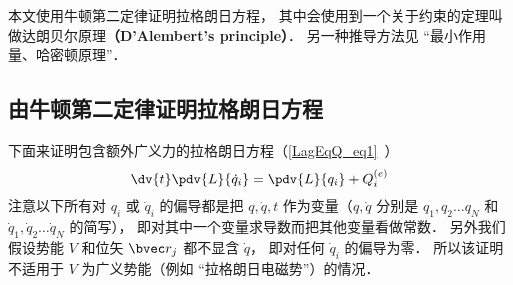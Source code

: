 

本文使用牛顿第二定律证明拉格朗日方程， 其中会使用到一个关于约束的定理叫做达朗贝尔原理\textbf{（D'Alembert's principle）}． 另一种推导方法见 “最小作用量、哈密顿原理”．

\subsection{由牛顿第二定律证明拉格朗日方程}
下面来证明包含额外广义力的拉格朗日方程（\autoref{LagEqQ_eq1}~）
\begin{equation}
\dv{t} \pdv{L}{\dot q_i} = \pdv{L}{q_i} + Q_i^{(e)}
\end{equation}
注意以下所有对 $q_i$ 或 $\dot q_i$ 的偏导都是把 $q, \dot q, t$ 作为变量（$q, \dot q$ 分别是 $q_1, q_2\dots q_N$ 和 $\dot q_1, \dot q_2\dots \dot q_N$ 的简写）， 即对其中一个变量求导数而把其他变量看做常数． 另外我们假设势能 $V$ 和位矢 $\bvec r_j$ 都不显含 $\dot q$， 即对任何 $\dot q_i$ 的偏导为零． 所以该证明不适用于 $V$ 为广义势能（例如 “拉格朗日电磁势”）的情况．

